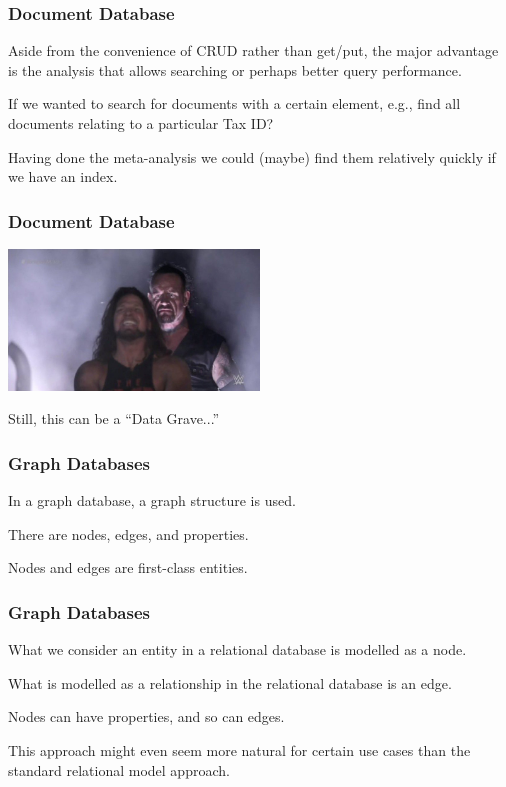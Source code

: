 \begin{frame}
\frametitle{Document Database}

Aside from the convenience of CRUD rather than get/put, the major advantage is the analysis that allows searching or perhaps better query performance. 

If we wanted to search for documents with a certain element, e.g., find all documents relating to a particular Tax ID?

Having done the meta-analysis we could (maybe) find them relatively quickly if we have an index.

\end{frame}



\begin{frame}
\frametitle{Document Database}

\begin{center}
	\includegraphics[width=0.5\textwidth]{images/undertaker.jpg}
\end{center}

Still, this can be a ``Data Grave...''

\end{frame}



\begin{frame}
\frametitle{Graph Databases}

In a graph database, a graph structure is used.

There are nodes, edges, and properties. 

Nodes and edges are first-class entities. 

\end{frame}



\begin{frame}
\frametitle{Graph Databases}


What we consider an entity in a relational database is modelled as a node. 

What is modelled as a relationship in the relational database is an edge. 

Nodes can have properties, and so can edges. 

This approach might even seem more natural for certain use cases than the standard relational model approach. 


\end{frame}



